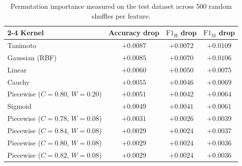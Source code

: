 \begin{table}[H]
    \centering
    \renewcommand{\arraystretch}{1.4}
    \begin{tabular}{lccc} \cline{2-4}
        Kernel & Accuracy drop & $\text{F1}_\text{H}$ drop & $\text{F1}_\text{M}$ drop \\ \hline \hline
        Tanimoto & $+0.0087$ & $+0.0072$ & $+0.0109$ \\ \hline
        Gaussian (RBF) & $+0.0085$ & $+0.0070$ & $+0.0106$ \\ \hline
        Linear & $+0.0060$ & $+0.0050$ & $+0.0075$ \\ \hline
        Cauchy & $+0.0055$ & $+0.0046$ & $+0.0069$ \\ \hline
        Piecewise ($C=0.80$, $W=0.20$) & $+0.0051$ & $+0.0042$ & $+0.0064$ \\ \hline
        Sigmoid & $+0.0049$ & $+0.0041$ & $+0.0061$ \\ \hline
        Piecewise ($C=0.78$, $W=0.08$) & $+0.0031$ & $+0.0026$ & $+0.0039$ \\ \hline
        Piecewise ($C=0.84$, $W=0.08$) & $+0.0029$ & $+0.0024$ & $+0.0037$ \\ \hline
        Piecewise ($C=0.80$, $W=0.08$) & $+0.0029$ & $+0.0024$ & $+0.0036$ \\ \hline
        Piecewise ($C=0.82$, $W=0.08$) & $+0.0029$ & $+0.0024$ & $+0.0036$ \\ \hline
    \end{tabular}
    \caption{Permutation importance measured on the test dataset across 500 random shuffles per feature.}
    \label{tab:permutation_importance_appendix}
\end{table}


